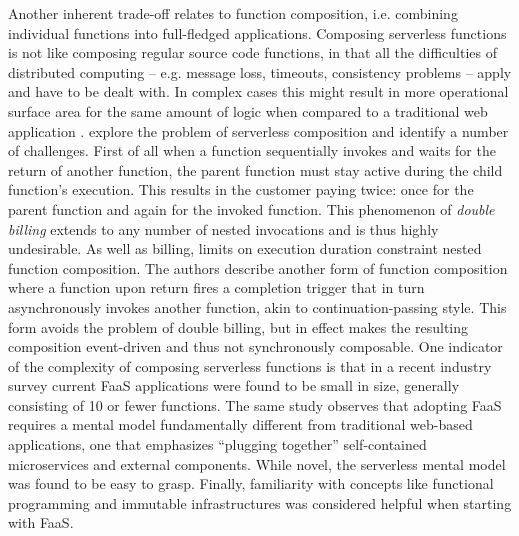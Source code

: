 Another inherent trade-off relates to function composition, i.e. combining individual functions into full-fledged applications. Composing serverless functions is not like composing regular source code functions, in that all the difficulties of distributed computing -- e.g. message loss, timeouts, consistency problems -- apply and have to be dealt with. In complex cases this might result in more operational surface area for the same amount of logic when compared to a traditional web application \parencite{cncf18serverlessWG}. \textcite{baldini17trilemma} explore the problem of serverless composition and identify a number of challenges. First of all when a function sequentially invokes and waits for the return of another function, the parent function must stay active during the child function's execution. This results in the customer paying twice: once for the parent function and again for the invoked function. This phenomenon of \textit{double billing} extends to any number of nested invocations and is thus highly undesirable. As well as billing, limits on execution duration constraint nested function composition. The authors describe another form of function composition where a function upon return fires a completion trigger that in turn asynchronously invokes another function, akin to continuation-passing style. This form avoids the problem of double billing, but in effect makes the resulting composition event-driven and thus not synchronously composable. One indicator of the complexity of composing serverless functions is that in a recent industry survey \parencite{leitner18industrialpractice} current FaaS applications were found to be small in size, generally consisting of 10 or fewer functions. The same study observes that adopting FaaS requires a mental model fundamentally different from traditional web-based applications, one that emphasizes ``plugging together'' self-contained microservices and external components. While novel, the serverless mental model was found to be easy to grasp. Finally, familiarity with concepts like functional programming and immutable infrastructures was considered helpful when starting with FaaS.

